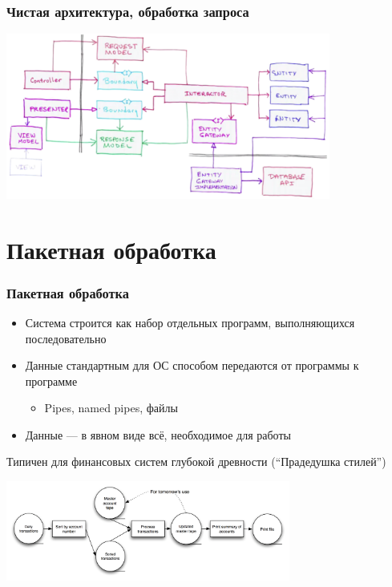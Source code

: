 \documentclass{../../slides-style}
\begin{document}
    \begin{frame}
        \frametitle{Чистая архитектура, обработка запроса}
        \begin{center}
            \includegraphics[width=0.8\textwidth]{cleanArchitectureControlFlow.png}
        \end{center}
    \end{frame}

    \section{Пакетная обработка}

    \begin{frame}
        \frametitle{Пакетная обработка}
        \begin{itemize}
            \item Система строится как набор отдельных программ, выполняющихся последовательно
            \item Данные стандартным для ОС способом передаются от программы к программе
            \begin{itemize}
                \item Pipes, named pipes, файлы
            \end{itemize}
            \item Данные --- в явном виде всё, необходимое для работы
        \end{itemize}
        Типичен для финансовых систем глубокой древности (``Прадедушка стилей'')
        \begin{center}
            \includegraphics[width=0.7\textwidth]{batch.png}
        \end{center}
    \end{frame}
\end{document}
